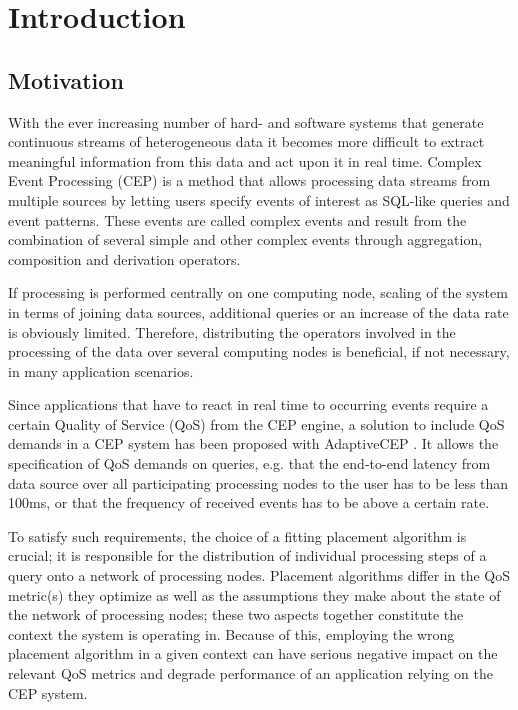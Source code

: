 
 


\chapter{Introduction}

	
\section{Motivation}
With the ever increasing number of hard- and software systems that generate continuous streams of heterogeneous data it becomes more difficult to extract meaningful information from this data and act upon it in real time. 
Complex Event Processing (CEP) is a method that allows processing data streams from multiple sources by letting users specify events of interest as SQL-like queries and event patterns. These events are called complex events and result from the combination of several simple and other complex events through aggregation, composition and derivation operators.

If processing is performed centrally on one computing node, scaling of the system in terms of joining data sources, additional queries or an increase of the data rate is obviously limited. 
Therefore, distributing the operators involved in the processing of the data over several computing nodes is beneficial, if not necessary, in many application scenarios.

Since applications that have to react in real time to occurring events require a certain Quality of Service  (QoS) from the CEP engine, a solution to include QoS demands in a CEP system has been proposed with AdaptiveCEP \cite{Weisenburger2017a}. %
It allows the specification of QoS demands on queries, e.g. that the end-to-end latency from data source over all participating processing nodes to the user has to be less than 100ms, or that the frequency of received events has to be above a certain rate. 

To satisfy such requirements, the choice of a fitting placement algorithm is crucial; it is responsible for the distribution of individual processing steps of a query onto a network of processing nodes. Placement algorithms differ in the QoS metric(s) they optimize as well as the assumptions they make about the state of the network of processing nodes; these two aspects together constitute the context the system is operating in. Because of this, employing the wrong placement algorithm in a given context can have serious negative impact on the relevant QoS metrics and degrade performance of an application relying on the CEP system. 

